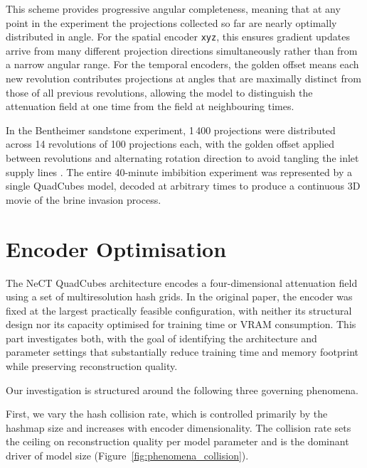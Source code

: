 \documentclass[12pt, a4paper, twoside]{report}
\begin{document}
This scheme provides progressive angular completeness, meaning that at any point in the experiment the projections collected so far are nearly optimally distributed in angle. For the spatial encoder \texttt{xyz}, this ensures gradient updates arrive from many different projection directions simultaneously rather than from a narrow angular range. For the temporal encoders, the golden offset means each new revolution contributes projections at angles that are maximally distinct from those of all previous revolutions, allowing the model to distinguish the attenuation field at one time from the field at neighbouring times.

In the Bentheimer sandstone experiment, 1\,400 projections were distributed across 14 revolutions of 100 projections each, with the golden offset applied between revolutions and alternating rotation direction to avoid tangling the inlet supply lines \citep{friis2025nect}. The entire 40-minute imbibition experiment was represented by a single QuadCubes model, decoded at arbitrary times to produce a continuous 3D movie of the brine invasion process.


\part{Encoder Optimisation}
\label{part:encoder_optimisation}

The NeCT QuadCubes architecture encodes a four-dimensional attenuation field using a set of multiresolution hash grids. In the original paper, the encoder was fixed at the largest practically feasible configuration, with neither its structural design nor its capacity optimised for training time or VRAM consumption. This part investigates both, with the goal of identifying the architecture and parameter settings that substantially reduce training time and memory footprint while preserving reconstruction quality.

Our investigation is structured around the following three governing phenomena.

First, we vary the hash collision rate, which is controlled primarily by the hashmap size and increases with encoder dimensionality. The collision rate sets the ceiling on reconstruction quality per model parameter and is the dominant driver of model size (Figure~\ref{fig:phenomena_collision}).
\end{document}
